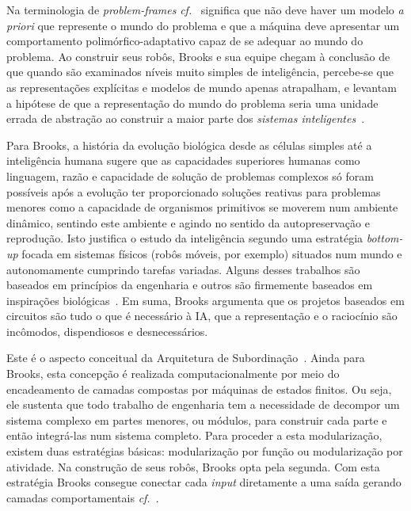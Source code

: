 Na terminologia de \textit{problem-frames} \textit{cf.}~\cite{Jackson:2000:PFA:513720} significa que não deve haver um modelo \textit{a priori} que represente o mundo do problema e que a máquina deve apresentar um comportamento polimórfico-adaptativo capaz de se adequar ao mundo do problema. Ao construir seus robôs, Brooks e sua equipe chegam à conclusão de que quando são examinados níveis muito simples de inteligência, percebe-se que as representações explícitas e modelos de mundo apenas atrapalham, e levantam a hipótese de que a representação do mundo do problema seria uma unidade errada de abstração ao construir a maior parte dos \emph{sistemas inteligentes}~\cite{brooks99a}.

Para Brooks, a história da evolução biológica desde as células simples até a inteligência humana sugere que as capacidades superiores humanas como linguagem, razão e capacidade de solução de problemas complexos só foram possíveis após a evolução ter proporcionado soluções reativas para problemas menores como a capacidade de organismos primitivos se moverem num ambiente dinâmico, sentindo este ambiente e agindo no sentido da autopreservação e reprodução. Isto justifica o  estudo da inteligência segundo uma estratégia \textit{bottom-up} focada em sistemas físicos (robôs móveis, por exemplo) situados num mundo e autonomamente cumprindo tarefas variadas. Alguns desses trabalhos são baseados em princípios da engenharia e outros são firmemente baseados em inspirações biológicas~\cite{brooks99a, brooks99b, brooks99c}. Em suma, Brooks argumenta que os projetos baseados em circuitos são tudo o que é necessário à IA, que a representação e o raciocínio são incômodos, dispendiosos e desnecessários.

Este é o aspecto conceitual da Arquitetura de Subordinação~\cite{brooks99a, brooks99b, brooks99c}. Ainda para Brooks, esta concepção é realizada computacionalmente por meio do encadeamento de camadas compostas por máquinas de estados finitos. Ou seja, ele sustenta que todo trabalho de engenharia tem a necessidade de decompor um sistema complexo em partes menores, ou módulos, para construir cada parte e então integrá-las num sistema completo. Para proceder a esta modularização, existem duas estratégias básicas: modularização por função ou modularização por atividade. Na construção de seus robôs, Brooks opta pela segunda. Com esta estratégia Brooks consegue conectar cada \textit{input} diretamente a uma saída gerando camadas comportamentais \textit{cf.}~\cite{parnas}.

